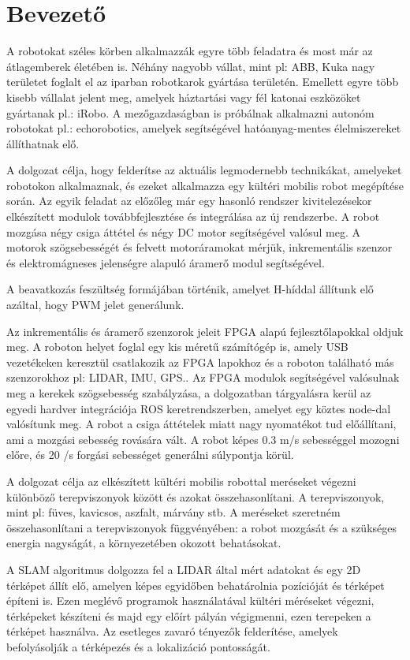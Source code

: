 \chapter{Bevezető}
A robotokat széles körben alkalmazzák egyre több feladatra és most már az átlagemberek életében is. Néhány nagyobb vállat, mint pl: ABB, Kuka nagy területet foglalt el az iparban robotkarok gyártása területén. Emellett egyre több kisebb vállalat jelent meg, amelyek háztartási vagy fél katonai eszközöket gyártanak pl.: iRobo. A mezőgazdaságban is próbálnak alkalmazni autonóm robotokat pl.: echorobotics, amelyek segítségével hatóanyag-mentes élelmiszereket állíthatnak elő.

A dolgozat célja, hogy felderítse az aktuális legmodernebb technikákat, amelyeket robotokon alkalmaznak, és ezeket alkalmazza egy kültéri mobilis robot megépítése során.
Az egyik feladat az előzőleg már egy hasonló rendszer kivitelezésekor elkészített modulok továbbfejlesztése és integrálása az új rendszerbe. A robot mozgása négy csiga áttétel és négy DC motor segítségével valósul meg. A motorok szögsebességét és  felvett motoráramokat mérjük, inkrementális szenzor és elektromágneses jelenségre alapuló áramerő modul segítségével.

A beavatkozás feszültség formájában történik, amelyet H-híddal állítunk elő azáltal, hogy PWM jelet generálunk.

Az inkrementális és áramerő szenzorok jeleit FPGA alapú fejlesztőlapokkal oldjuk meg. A roboton helyet foglal egy kis méretű számítógép is, amely USB vezetékeken keresztül csatlakozik az FPGA lapokhoz és a roboton található más szenzorokhoz pl: LIDAR, IMU, GPS..
Az FPGA modulok segítségével valósulnak meg a kerekek szögsebesség szabályzása, a dolgozatban tárgyalásra kerül az egyedi hardver integrációja ROS keretrendszerben, amelyet egy köztes node-dal valósítunk meg.
A robot a csiga áttételek miatt nagy nyomatékot tud előállítani, ami a mozgási sebesség rovására vált. A robot képes 0.3 m/s sebességgel mozogni előre, és 20 \degree/s forgási sebességet generálni súlypontja körül.

A dolgozat célja az elkészített kültéri mobilis robottal meréseket végezni különböző terepviszonyok között és azokat összehasonlítani. A terepviszonyok, mint pl: füves, kavicsos, aszfalt, márvány stb. A meréseket szeretném összehasonlítani a terepviszonyok függvényében: a robot mozgását és a szükséges energia nagyságát, a környezetében okozott behatásokat.

A SLAM algoritmus dolgozza fel a LIDAR által mért adatokat és egy 2D térképet állít elő, amelyen képes egyidőben behatárolnia pozícióját és térképet építeni is. Ezen meglévő programok használatával kültéri méréseket végezni, térképeket készíteni és majd egy előírt pályán végigmenni, ezen terepeken a térképet használva. Az esetleges zavaró tényezők felderítése, amelyek befolyásolják a térképezés és a lokalizáció pontosságát.
